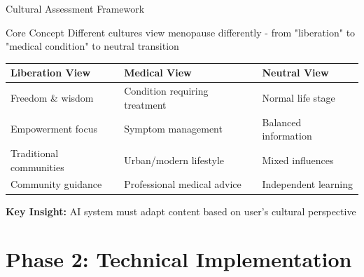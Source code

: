 \documentclass[aspectratio=169]{beamer}
\begin{document}
\begin{frame}{Cultural Assessment Framework}
    \begin{block}{Core Concept}
        Different cultures view menopause differently - from "liberation" to "medical condition" to neutral transition
    \end{block}
    
    \begin{table}
        \centering
        \small
        \begin{tabular}{|l|l|l|}
            \hline
            \textbf{Liberation View} & \textbf{Medical View} & \textbf{Neutral View} \\
            \hline
            Freedom \& wisdom & Condition requiring treatment & Normal life stage \\
            Empowerment focus & Symptom management & Balanced information \\
            Traditional communities & Urban/modern lifestyle & Mixed influences \\
            Community guidance & Professional medical advice & Independent learning \\
            \hline
        \end{tabular}
    \end{table}
    
    \textbf{Key Insight:} AI system must adapt content based on user's cultural perspective
\end{frame}

\section{Phase 2: Technical Implementation}
\end{document}
